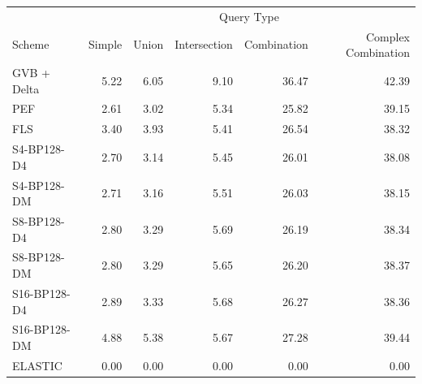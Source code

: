 \begin{tabular}{lrrrrr}
\toprule
 & \multicolumn{5}{c}{Query Type} \\
Scheme & Simple & Union & Intersection & Combination & Complex Combination \\
\midrule
GVB + Delta & 5.22 & 6.05 & 9.10 & 36.47 & 42.39 \\
PEF & 2.61 & 3.02 & 5.34 & 25.82 & 39.15 \\
FLS & 3.40 & 3.93 & 5.41 & 26.54 & 38.32 \\
S4-BP128-D4 & 2.70 & 3.14 & 5.45 & 26.01 & 38.08 \\
S4-BP128-DM & 2.71 & 3.16 & 5.51 & 26.03 & 38.15 \\
S8-BP128-D4 & 2.80 & 3.29 & 5.69 & 26.19 & 38.34 \\
S8-BP128-DM & 2.80 & 3.29 & 5.65 & 26.20 & 38.37 \\
S16-BP128-D4 & 2.89 & 3.33 & 5.68 & 26.27 & 38.36 \\
S16-BP128-DM & 4.88 & 5.38 & 5.67 & 27.28 & 39.44 \\
ELASTIC & 0.00 & 0.00 & 0.00 & 0.00 & 0.00 \\
\bottomrule
\end{tabular}
